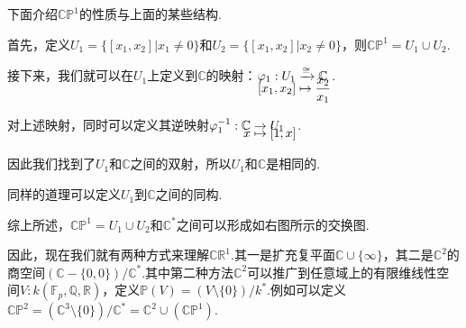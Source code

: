 \begin{figure}
    \vspace{-1 em}
    \vspace{-5 em}
\end{figure}
下面介绍$\mathbb{C}\mathbb{P}^1$的性质与上面的某些结构.\par
首先，定义$U_1=\{[x_1,x_2]|x_1\neq 0\}$和$U_2=\{[x_1,x_2]|x_2\neq 0\}$，则$\mathbb{C}\mathbb{P}^1=U_1\cup U_2$.\par
接下来，我们就可以在$U_1$上定义到$\mathbb{C}$的映射：$\setjot[-6]\begin{aligned}[t]
    \varphi_1: U_1 &\xrightarrow{\cong} \mathbb{C} \\
    [x_1,x_2] &\mapsto \frac{x_2}{x_1}    
\end{aligned}$.\par
对上述映射，同时可以定义其逆映射$\setjot[-6]\begin{aligned}[t]
    \varphi_1^{-1}: \mathbb{C} &\rightarrow U_1 \\
    x &\mapsto [1,x]
\end{aligned}$.\par
因此我们找到了$U_1$和$\mathbb{C}$之间的双射，所以$U_1$和$\mathbb{C}$是相同的.\par
同样的道理可以定义$U_1$到$\mathbb{C}$之间的同构.\par
综上所述，$\mathbb{C}\mathbb{P}^1=U_1\cup U_2$和$\mathbb{C}^*$之间可以形成如右图所示的交换图.

因此，现在我们就有两种方式来理解$\mathbb{C}\mathbb{R}^1$.其一是扩充复平面$\mathbb{C}\cup\{\infty\}$，其二是$\mathbb{C}^2$的商空间$(\mathbb{C}-\{0,0\})/\mathbb{C}^*$.其中第二种方法$\mathbb{C}^2$可以推广到任意域上的有限维线性空间$V:k(\mathbb{F}_p,\mathbb{Q},\mathbb{R})$，定义$\mathbb{P}(V)=(V\setminus\{0\})/k^*$.例如可以定义$\mathbb{C}\mathbb{P}^2=\left(\mathbb{C}^3\setminus\{0\}\right)/\mathbb{C}^*=\mathbb{C}^2\cup(\mathbb{C}\mathbb{P}^1)$.

